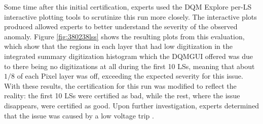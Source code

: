 Some time after this initial certification, experts used the DQM Explore per-LS interactive plotting tools to scrutinize this run more closely. The interactive plots produced allowed experts to better understand the severity of the observed anomaly. Figure \ref{fig:380238lss} shows the resulting plots from this evaluation, which show that the regions in each layer that had low digitization in the integrated summary digitization histogram which the DQMGUI offered was due to there being no digitizations at all during the first 10 LSs, meaning that about $1/8$ of each Pixel layer was off, exceeding the expected severity for this issue. With these results, the certification for this run was modified to reflect the reality: the first 10 LSs were certified as bad, while the rest, where the issue disappears, were certified as good. Upon further investigation, experts determined that the issue was caused by a low voltage trip \cite{CMS-DP-2024-070}. 

